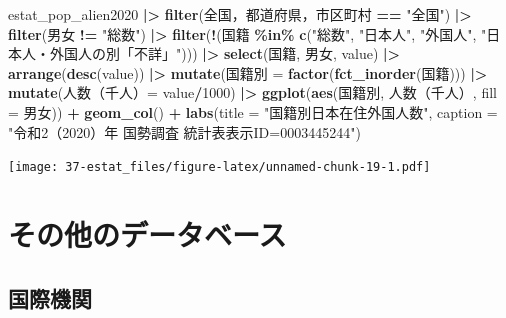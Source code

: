 \documentclass[
  xelatex, ja=standard]{bxjsbook}
\newenvironment{Shaded}{\begin{snugshade}}{\end{snugshade}}
\newcommand{\AttributeTok}[1]{\textcolor[rgb]{0.13,0.29,0.53}{#1}}
\newcommand{\DecValTok}[1]{\textcolor[rgb]{0.00,0.00,0.81}{#1}}
\newcommand{\FunctionTok}[1]{\textcolor[rgb]{0.13,0.29,0.53}{\textbf{#1}}}
\newcommand{\NormalTok}[1]{#1}
\newcommand{\OtherTok}[1]{\textcolor[rgb]{0.56,0.35,0.01}{#1}}
\newcommand{\SpecialCharTok}[1]{\textcolor[rgb]{0.81,0.36,0.00}{\textbf{#1}}}
\newcommand{\StringTok}[1]{\textcolor[rgb]{0.31,0.60,0.02}{#1}}
\theoremstyle{definition}
\theoremstyle{definition}
\theoremstyle{definition}
\theoremstyle{definition}
\theoremstyle{remark}
\begin{document}
\begin{Shaded}
\begin{Highlighting}[]
\NormalTok{estat\_pop\_alien2020 }\SpecialCharTok{|\textgreater{}} 
  \FunctionTok{filter}\NormalTok{(}\StringTok{\textasciigrave{}}\AttributeTok{全国，都道府県，市区町村}\StringTok{\textasciigrave{}} \SpecialCharTok{==} \StringTok{"全国"}\NormalTok{) }\SpecialCharTok{|\textgreater{}}
  \FunctionTok{filter}\NormalTok{(男女 }\SpecialCharTok{!=} \StringTok{"総数"}\NormalTok{) }\SpecialCharTok{|\textgreater{}}
  \FunctionTok{filter}\NormalTok{(}\SpecialCharTok{!}\NormalTok{(国籍 }\SpecialCharTok{\%in\%} \FunctionTok{c}\NormalTok{(}\StringTok{"総数"}\NormalTok{, }\StringTok{"日本人"}\NormalTok{, }\StringTok{"外国人"}\NormalTok{, }\StringTok{"日本人・外国人の別「不詳」"}\NormalTok{))) }\SpecialCharTok{|\textgreater{}}
  \FunctionTok{select}\NormalTok{(国籍, 男女, value) }\SpecialCharTok{|\textgreater{}}
  \FunctionTok{arrange}\NormalTok{(}\FunctionTok{desc}\NormalTok{(value)) }\SpecialCharTok{|\textgreater{}} 
  \FunctionTok{mutate}\NormalTok{(国籍別 }\OtherTok{=} \FunctionTok{factor}\NormalTok{(}\FunctionTok{fct\_inorder}\NormalTok{(国籍))) }\SpecialCharTok{|\textgreater{}}
  \FunctionTok{mutate}\NormalTok{(}\StringTok{\textasciigrave{}}\AttributeTok{人数（千人）}\StringTok{\textasciigrave{}}\OtherTok{=}\NormalTok{ value}\SpecialCharTok{/}\DecValTok{1000}\NormalTok{) }\SpecialCharTok{|\textgreater{}}
  \FunctionTok{ggplot}\NormalTok{(}\FunctionTok{aes}\NormalTok{(国籍別, }\StringTok{\textasciigrave{}}\AttributeTok{人数（千人）}\StringTok{\textasciigrave{}}\NormalTok{, }\AttributeTok{fill =}\NormalTok{ 男女)) }\SpecialCharTok{+} \FunctionTok{geom\_col}\NormalTok{() }\SpecialCharTok{+}
  \FunctionTok{labs}\NormalTok{(}\AttributeTok{title =} \StringTok{"国籍別日本在住外国人数"}\NormalTok{, }\AttributeTok{caption =} \StringTok{"令和2（2020）年 国勢調査 統計表表示ID=0003445244"}\NormalTok{)}
\end{Highlighting}
\end{Shaded}

\texttt{[image: 37-estat\_files/figure-latex/unnamed-chunk-19-1.pdf]}

\hypertarget{others}{%
\chapter{その他のデータベース}\label{others}}

\hypertarget{ux56fdux969bux6a5fux95a2}{%
\section{国際機関}\label{ux56fdux969bux6a5fux95a2}}
\end{document}
